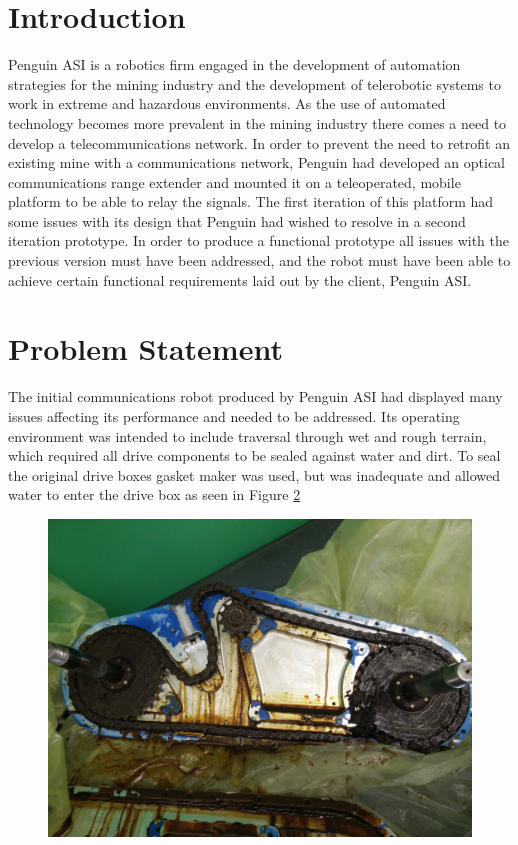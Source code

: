\section{Introduction}
Penguin ASI is a robotics firm engaged in the development of automation strategies for the mining industry and the development of telerobotic systems to work in extreme and hazardous environments. As the use of automated technology becomes more prevalent in the mining industry there comes a need to develop a telecommunications network. In order to prevent the need to retrofit an existing mine with a communications network, Penguin had developed an optical communications range extender and mounted it on a teleoperated, mobile platform to be able to relay the signals. The first iteration of this platform had some issues with its design that Penguin had wished to resolve in a second iteration prototype. In order to produce a functional prototype all issues with the previous version must have been addressed, and the robot must have been able to achieve certain functional requirements laid out by the client, Penguin ASI.  
\section{Problem Statement}
The initial communications robot produced by Penguin ASI had displayed many issues affecting its performance and needed to be addressed. Its operating environment was intended to include traversal through wet and rough terrain, which required all drive components to be sealed against water and dirt. To seal the original drive boxes gasket maker was used, but was inadequate and allowed water to enter the drive box as seen in Figure \ref{} 
 
\begin{figure}[H]
\centering
\includegraphics[width=0.5\linewidth]{./images/inside_drive_box_orig}
\caption{}
\label{fig:inside_drive_box_orig}
\end{figure}
 